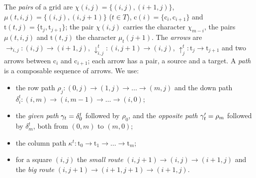 \begin{definition}\label{def:pf:rowprops:arrows}
The \emph{pairs} of a grid are $\chi(i,j)=\{(i,j),(i+1,j)\}$, $\mu(t,i,j)=\{(i,j),(i,j+1)\}$ ($t\in T$),
$\mathrm c(i)=\{\mathrm c_i,\mathrm c_{i+1}\}$ and $\mathrm t(t,j)=\{\mathrm t_j,\mathrm t_{j+1}\}$; the pair $\chi(i,j)$
carries the character $\chi_{m-i}$, the pairs $\mu(t,i,j)$ and $\mathrm t(t,j)$ the character $\mu_t(j+1)$. The
\emph{arrows} are $\rightarrow_{i,j}:(i,j)\to(i+1,j)$, $\downarrow^t_{i,j}:(i,j+1)\to(i,j)$,
$\uparrow^t_j:\mathrm t_j\to\mathrm t_{j+1}$ and two arrows between $\mathrm c_i$ and $\mathrm c_{i+1}$; each arrow has a
pair, a source and a target. A \emph{path} is a composable sequence of arrows. We use:
\begin{itemize}
\item the row path $\rho_j:(0,j)\to(1,j)\to\dots\to(m,j)$ and the down path $\delta_i^t:(i,m)\to(i,m-1)\to\dots\to(i,0)$;
\item the \emph{given path} $\gamma_t=\delta^t_0$ followed by $\rho_0$, and the \emph{opposite path}
$\gamma'_t=\rho_m$ followed by $\delta^t_m$, both from $(0,m)$ to $(m,0)$;
\item the column path $\kappa^t:\mathrm t_0\to\mathrm t_1\to\dots\to\mathrm t_m$;
\item for a square $(i,j)$ the \emph{small route} $(i,j+1)\to(i,j)\to(i+1,j)$ and the \emph{big route}
$(i,j+1)\to(i+1,j+1)\to(i+1,j)$.
\end{itemize}
\end{definition}

